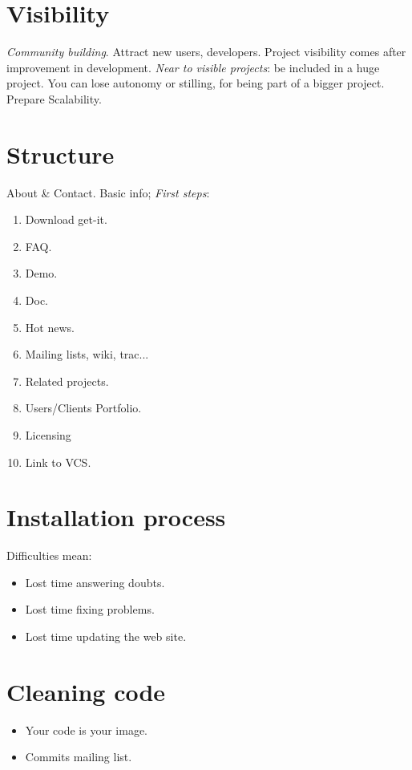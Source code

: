 \documentclass[11pt]{scrartcl}
\begin{document}
\section{Visibility}

\emph{Community building}. Attract new users, developers. Project visibility comes after improvement in development.
\emph{Near to visible projects}: be included in a huge project. You can lose autonomy or stilling, for being part of a bigger project. Prepare Scalability.

\section{Structure}

About \& Contact.
Basic info; \emph{First steps}:
\begin{enumerate}
	\item Download get-it.
	\item FAQ.
	\item Demo.
	\item Doc.
	\item Hot news. 
	\item Mailing lists, wiki, trac...
	\item Related projects.
	\item Users/Clients Portfolio.
	\item Licensing
	\item Link to VCS.
\end{enumerate}

\section{Installation process}

Difficulties mean:
\begin{itemize}
	\item Lost time answering doubts.
	\item Lost time fixing problems.
	\item Lost time updating the web site.
\end{itemize}

\section{Cleaning code}

\begin{itemize}
	\item Your code is your image.
	\item Commits mailing list.
\end{itemize}
\end{document}
